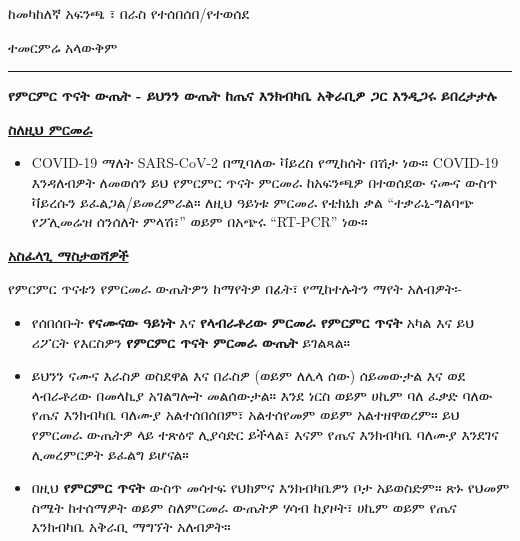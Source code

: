 \documentclass[10pt]{article}
\newcommand{\PageLine}{\rule{\textwidth}{0.25mm}}
\begin{document}
\begin{description}[font=\normalfont,align=left,labelwidth=8em]
\item [\textbf{\VAR{pat_name|e}}]
\item [\textbf{የትውልድ ቀን፡-}] 
\item [\textbf{ናሙና፡-}] ከመካከለኛ አፍንጫ ፣ በራስ የተሰበሰበ/የተወሰደ
\item [\textbf{የስብስብ ባርኮድ፡}] 
\item [\textbf{የስብስብ ቀን፡}] 
\item [\textbf{የሪፖርት ቀን፡}]
  ተመርምሬ አላውቅም
\end{description}

\PageLine

\begin{center}
\Large
\textbf{የምርምር ጥናት ውጤት - ይህንን ውጤት ከጤና እንክብካቤ አቅራቢዎ ጋር እንዲጋሩ ይበረታታሉ}
\end{center}

\bigskip

\large \underline{\textbf{ስለዚህ ምርመራ}}

\begin{itemize}
\item

  COVID-19 ማለት SARS-CoV-2 በሚባለው ቫይረስ የሚከሰት በሽታ ነው። COVID-19 እንዳለብዎት ለመወሰን
  ይህ የምርምር ጥናት ምርመራ ከአፍንጫዎ በተወሰደው ናሙና ውስጥ ቫይረሱን ይፈልጋል/ይመረምራል። ለዚህ ዓይነቱ
  ምርመራ የቴክኒክ ቃል ``ተቃራኒ-ግልባጭ የፖሊመሬዝ ሰንሰለት ምላሽ፣'' ወይም በአጭሩ ``RT-PCR'' ነው።

\end{itemize}

\bigskip

\large \underline{\textbf{አስፈላጊ ማስታወሻዎች}}

የምርምር ጥናቱን የምርመራ ውጤትዎን ከማየትዎ በፊት፣ የሚከተሉትን ማየት አለብዎት፡-

\begin{itemize}
\item

  የሰበሰቡት \textbf{የናሙናው ዓይነት} እና \textbf{የላብራቶሪው ምርመራ የምርምር ጥናት} አካል እና ይህ
  ሪፖርት የእርስዎን \textbf{የምርምር ጥናት ምርመራ ውጤት} ይገልጻል።

\item

  ይህንን ናሙና እራስዎ ወስደዋል እና በራስዎ (ወይም ለሌላ ሰው) ሰይመውታል እና ወደ ላብራቶሪው በመላኪያ
  አገልግሎት መልሰውታል። እንደ ነርስ ወይም ሀኪም ባለ ፈቃድ ባለው የጤና እንክብካቤ ባለሙያ አልተሰበሰበም፣
  አልተሰየመም ወይም አልተዘዋወረም። ይህ የምርመራ ውጤትዎ ላይ ተጽዕኖ ሊያሳድር ይችላል፣ እናም የጤና እንክብካቤ
  ባለሙያ እንደገና ሊመረምርዎት ይፈልግ ይሆናል።

\item

  በዚህ \textbf{የምርምር ጥናት} ውስጥ መሳተፍ የህክምና እንክብካቤዎን ቦታ አይወስድም። ጽኑ የህመም ስሜት
  ከተሰማዎት ወይም ስለምርመራ ውጤትዎ ሃሳብ ከያዞት፣ ሀኪም ወይም የጤና እንክብካቤ አቅራቢ ማግኘት አለብዎት።

\end{itemize}
\end{document}
